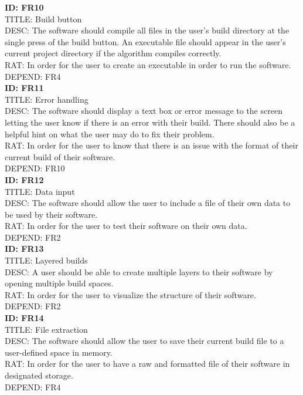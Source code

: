 \documentclass[journal,10pt,onecolumn,compsoc]{IEEEtran} \usepackage[margin=1.0in]{geometry} \usepackage{pdfpages} \usepackage{graphicx}
\begin{document}
\noindent
\textbf{ID: FR10}\\
TITLE: Build button\\
DESC: The software should compile all files in the user's build directory at the single press of the build button. 
An executable file should appear in the user's current project directory if the algorithm compiles correctly.\\
RAT: In order for the user to create an executable in order to run the software.\\
DEPEND: FR4\\

\noindent
\textbf{ID: FR11}\\
TITLE: Error handling\\
DESC: The software should display a text box or error message to the screen letting the user know if there is an error with their build. 
There should also be a helpful hint on what the user may do to fix their problem.\\
RAT: In order for the user to know that there is an issue with the format of their current build of their software.\\
DEPEND: FR10\\

\noindent
\textbf{ID: FR12}\\
TITLE: Data input\\
DESC: The software should allow the user to include a file of their own data to be used by their software.\\
RAT: In order for the user to test their software on their own data.\\
DEPEND: FR2\\

\noindent
\textbf{ID: FR13}\\
TITLE: Layered builds\\
DESC: A user should be able to create multiple layers to their software by opening multiple build spaces.\\
RAT: In order for the user to visualize the structure of their software.\\
DEPEND: FR2\\

\noindent
\textbf{ID: FR14}\\
TITLE: File extraction\\
DESC: The software should allow the user to save their current build file to a user-defined space in memory.\\
RAT: In order for the user to have a raw and formatted file of their software in designated storage.\\
DEPEND: FR4\\
\end{document}
